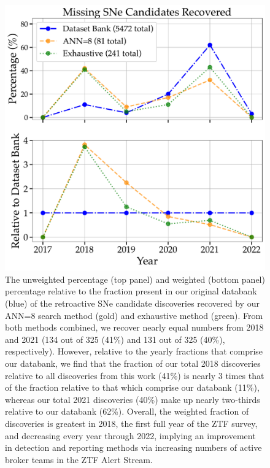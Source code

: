 \documentclass[twocolumn]{aastex63}
\begin{document}
\begin{figure}
    \centering
    \includegraphics[width=\columnwidth]{Figures/missing_SNe_recovered.pdf}
    \caption{
    The unweighted percentage (top panel) and weighted (bottom panel) percentage relative to the fraction present in our original databank (blue) of the retroactive SNe candidate discoveries recovered by our ANN=8 search method (gold) and exhaustive method (green). From both methods combined, we recover nearly equal numbers from 2018 and 2021 (134 out of 325 (41\%) and 131 out of 325 (40\%), respectively). However, relative to the yearly fractions that comprise our databank, we find that the fraction of our total 2018 discoveries relative to all discoveries from this work (41\%) is nearly 3 times that of the fraction relative to that which comprise our databank (11\%), whereas our total 2021 discoveries (40\%) make up nearly two-thirds relative to our databank (62\%). Overall, the weighted fraction of discoveries is greatest in 2018, the first full year of the ZTF survey, and decreasing every year through 2022, implying an improvement in detection and reporting methods via increasing numbers of active broker teams in the ZTF Alert Stream.
    } 
    \label{fig:recovered_SNe}
\end{figure}
\end{document}
